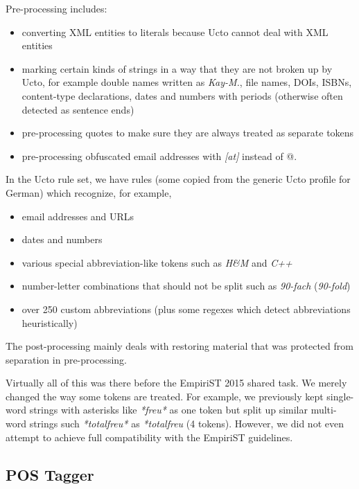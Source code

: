 \documentclass[11pt]{article}
\newcommand{\Lf}{
  \setlength{\itemsep}{1pt}
  \setlength{\parskip}{0pt}
  \setlength{\parsep}{0pt}
}
\begin{document}
Pre-processing includes:

\begin{itemize}\Lf
  \item converting XML entities to literals because Ucto cannot deal with XML entities
  \item marking certain kinds of strings in a way that they are not broken up by Ucto, for example double names written as \textit{Kay-M.}, file names, DOIs, ISBNs, content-type declarations, dates and numbers with periods (otherwise often detected as sentence ends)
  \item pre-processing quotes to make sure they are always treated as separate tokens
  \item pre-processing obfuscated email addresses with \textit{[at]} instead of @.
\end{itemize}

In the Ucto rule set, we have rules (some copied from the generic Ucto profile for German) which recognize, for example,

\begin{itemize}\Lf
  \item email addresses and URLs
  \item dates and numbers
  \item various special abbreviation-like tokens such as \textit{H\&M} and \textit{C++}
  \item number-letter combinations that should not be split such as \textit{90-fach} (\textit{90-fold})
  \item over 250 custom abbreviations (plus some regexes which detect abbreviations heuristically)
\end{itemize}

The post-processing mainly deals with restoring material that was protected from separation in pre-processing.

Virtually all of this was there before the EmpiriST 2015 shared task.
We merely changed the way some tokens are treated.
For example, we previously kept single-word strings with asterisks like \textit{*freu*} as one token but split up similar multi-word strings such \textit{*total\textvisiblespace freu*} as \textit{*\textvisiblespace total\textvisiblespace freu\textvisiblespace *} (4 tokens).
However, we did not even attempt to achieve full compatibility with the EmpiriST guidelines.

\subsection{POS Tagger}
\label{sec:postagger}
\end{document}
